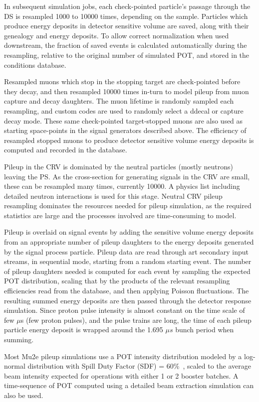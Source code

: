 In subsequent simulation jobs, each check-pointed particle's passage through the DS is resampled  1000 to 10000 times, depending on the sample. Particles which produce energy deposits in detector sensitive volume are saved, along with their genealogy and energy deposits. To allow correct normalization when used downstream, the fraction of saved events is calculated automatically during the resampling, relative to the original number of simulated POT, and stored in the conditions database.

Resampled muons which stop in the stopping target are check-pointed before they decay, and then resampled 10000 times in-turn to model pileup from muon capture and decay daughters. The muon lifetime is randomly sampled each resampling, and custom codes are used to randomly select a ddecal  or capture decay mode. These same check-pointed
target-stopped muons are also used as starting space-points in the signal generators described above. The efficiency of resampled stopped muons to produce detector sensitive volume energy deposits is computed and recorded in the database.

Pileup in the CRV is dominated by the neutral particles (mostly neutrons) leaving the PS.  As the cross-section for generating signals in the CRV are small, these can be resampled many times, currently 10000. A physics list including detailed neutron interactions is used for this stage.  Neutral CRV pileup resampling dominates the resources needed for pileup simulation, as the required statistics are large and the processes involved are time-consuming to model.

Pileup is overlaid on signal events by adding the sensitive volume energy deposits from an appropriate number of pileup daughters to the energy deposits generated by the signal process particle. Pileup data are read through art secondary input streams, in sequential mode, starting from a random starting event.
The number of pileup daughters needed is computed for each event by sampling the expected POT distribution, scaling that by the products of the relevant resampling efficiencies read from the database, and then applying Poisson fluctuations.  The resulting summed energy deposits are then passed through the detector response simulation. Since proton pulse intensity is almost constant on the time scale of few $\mu $s (few proton pulses), and the pulse trains are long, the time of each pileup particle energy deposit is wrapped around the 1.695 $\mu s$ bunch period when summing.

Most Mu2e pileup simulations use a POT intensity distribution modeled by a log-normal distribution with Spill Duty Factor (SDF) = 60\%~\cite{SU2020:2023}, scaled to the average beam intensity expected for operations with either 1 or 2 booster batches. A time-sequence of POT computed using a detailed beam extraction simulation can also be used.

